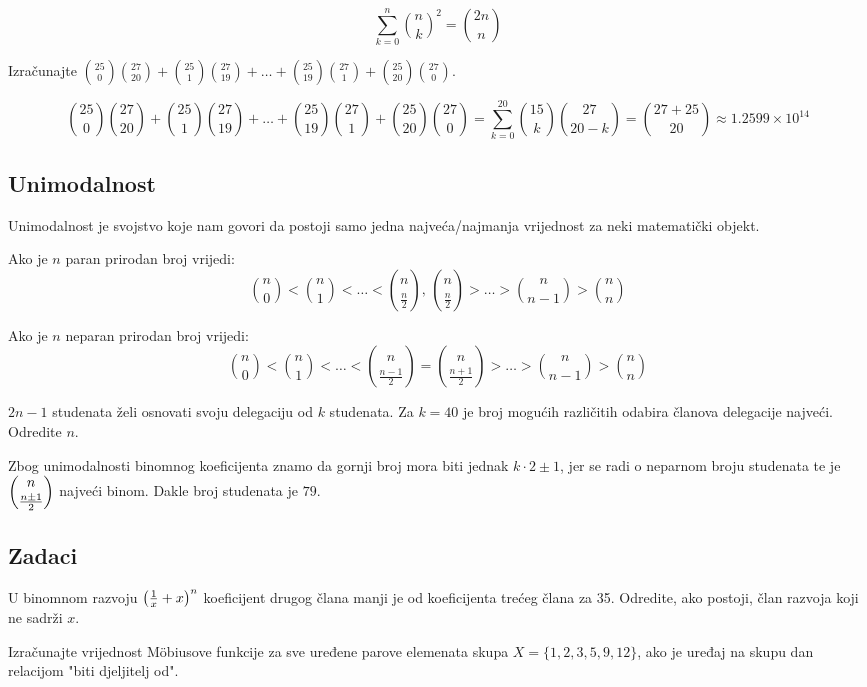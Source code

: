 \begin{corollary}
    $$
        \sum_{k=0}^{n} \binom{n}{k}^2 = \binom{2n}{n}
    $$
\end{corollary}

\begin{example}
    Izračunajte $\displaystyle \binom{25}{0}\binom{27}{20}+\binom{25}{1}\binom{27}{19}+\dots+\binom{25}{19}\binom{27}{1}+\binom{25}{20}\binom{27}{0}$.
\end{example}

$$
    \binom{25}{0}\binom{27}{20}+\binom{25}{1}\binom{27}{19}+\dots+\binom{25}{19}\binom{27}{1}+\binom{25}{20}\binom{27}{0} = \sum_{k=0}^{20} \binom{15}{k}\binom{27}{20-k} = \binom{27+25}{20} \approx 1.2599 \times 10^{14}
$$


\subsection{Unimodalnost}

Unimodalnost je svojstvo koje nam govori da postoji samo jedna najveća/najmanja
vrijednost za neki matematički objekt.

Ako je $n$ paran prirodan broj vrijedi:
$$
\binom{n}{0}<\binom{n}{1}<\dots<\binom{n}{\frac{n}{2}},\, \binom{n}{\frac{n}{2}}>\dots>\binom{n}{n-1}>\binom{n}{n}
$$

\noindent
Ako je $n$ neparan prirodan broj vrijedi:
$$
\binom{n}{0}<\binom{n}{1}<\dots<\binom{n}{\frac{n-1}{2}} = \binom{n}{\frac{n+1}{2}}>\dots>\binom{n}{n-1}>\binom{n}{n}
$$

\begin{example}
    $2n - 1$ studenata želi osnovati svoju delegaciju od $k$ studenata. Za $k = 40$ je
    broj mogućih različitih odabira članova delegacije najveći. Odredite $n$.
\end{example}

Zbog unimodalnosti binomnog koeficijenta znamo da gornji broj mora biti jednak
$k\cdot 2 \pm 1$, jer se radi o neparnom broju studenata te je
$\dbinom{n}{\frac{n\pm 1}{2}}$ najveći binom. Dakle broj studenata je $79$.

\subsection{Zadaci}

\begin{example}
    U binomnom razvoju $\left({1\over x} + x\right)^n$ koeficijent drugog člana
    manji je od koeficijenta trećeg člana za 35. Odredite, ako postoji, član
    razvoja koji ne sadrži $x$.
\end{example}

\begin{example}
    Izračunajte vrijednost Möbiusove funkcije za sve uređene parove elemenata
    skupa $X=\{1,2,3,5,9,12\}$, ako je uređaj na skupu dan relacijom "biti
    djeljitelj od".
\end{example}
